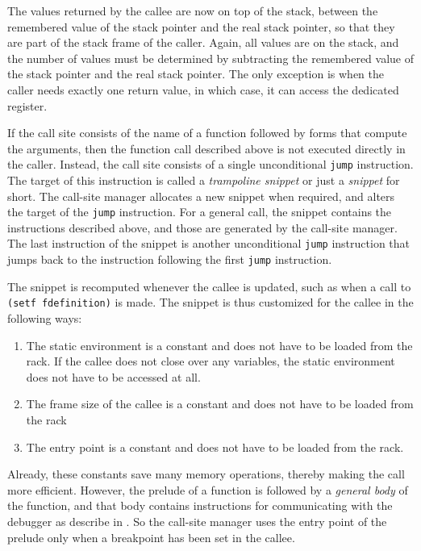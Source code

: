 The values returned by the callee are now on top of the stack, between
the remembered value of the stack pointer and the real stack pointer,
so that they are part of the stack frame of the caller.  Again, all
values are on the stack, and the number of values must be determined
by subtracting the remembered value of the stack pointer and the real
stack pointer.  The only exception is when the caller needs exactly
one return value, in which case, it can access the dedicated register.

If the call site consists of the name of a function followed by forms
that compute the arguments, then the function call described above is
not executed directly in the caller.  Instead, the call site consists
of a single unconditional \texttt{jump} instruction.  The target of
this instruction is called a \emph{trampoline snippet} or just a
\emph{snippet} for short.  The call-site manager allocates a new
snippet when required, and alters the target of the \texttt{jump}
instruction.  For a general call, the snippet contains the
instructions described above, and those are generated by the call-site
manager.  The last instruction of the snippet is another unconditional
\texttt{jump} instruction that jumps back to the instruction following
the first \texttt{jump} instruction.

The snippet is recomputed whenever the callee is updated, such as when
a call to \texttt{(setf fdefinition)} is made.  The snippet is thus
customized for the callee in the following ways:

\begin{enumerate}
\item The static environment is a constant and does not have to be
  loaded from the rack.  If the callee does not close over any
  variables, the static environment does not have to be accessed at
  all.
\item The frame size of the callee is a constant and does not
  have to be loaded from the rack
\item The entry point is a constant and does not have to be loaded
  from the rack.
\end{enumerate}

Already, these constants save many memory operations, thereby making
the call more efficient.  However, the prelude of a function is
followed by a \emph{general body} of the function, and that body
contains instructions for communicating with the debugger as describe
in .  So the call-site manager uses the entry
point of the prelude only when a breakpoint has been set in the
callee.

